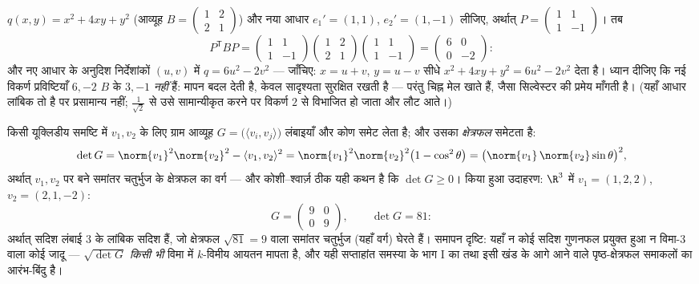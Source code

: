 \begin{example}[सर्वांगसमता क्रिया में]\label{ex:b2:quadratic:congruence}
$q(x, y) = x^2 + 4xy + y^2$ (आव्यूह $B = \begin{pmatrix} 1
& 2\\ 2 & 1\end{pmatrix}$) और नया आधार $e_1' = (1, 1)$, $e_2' = (1, -1)$ लीजिए, अर्थात् $P = \begin{pmatrix} 1 & 1\\ 1 &
-1\end{pmatrix}$। तब
\[
P^{\mathsf T}BP
= \begin{pmatrix} 1 & 1\\ 1 & -1\end{pmatrix}
\begin{pmatrix} 1 & 2\\ 2 & 1\end{pmatrix}
\begin{pmatrix} 1 & 1\\ 1 & -1\end{pmatrix}
= \begin{pmatrix} 6 & 0\\ 0 & -2\end{pmatrix} :
\]
और नए आधार के अनुदिश निर्देशांकों $(u, v)$ में $q = 6u^2 -
2v^2$ --- जाँचिए: $x = u + v$, $y = u - v$ सीधे
$x^2 + 4xy +
y^2 = 6u^2 - 2v^2$ देता है। ध्यान दीजिए कि नई विकर्ण प्रविष्टियाँ $6,
-2$ $B$ के
 $3, -1$ \emph{नहीं} हैं:  मापन बदल देती है, केवल
सादृश्यता  सुरक्षित रखती है --- परंतु चिह्न मेल खाते हैं, जैसा
सिल्वेस्टर की प्रमेय माँगती है। (यहाँ आधार लांबिक तो है पर प्रसामान्य
नहीं; $\frac{1}{\sqrt2}$ से उसे सामान्यीकृत करने पर विकर्ण $2$ से विभाजित हो जाता और
 लौट आते।)
\end{example}

\begin{example}[ग्राम सारणिक क्षेत्रफल मापते हैं]\label{ex:b2:quadratic:gramarea}
किसी यूक्लिडीय समष्टि में $v_1, v_2$ के लिए ग्राम आव्यूह $G =
\bigl(\langle v_i, v_j\rangle\bigr)$ लंबाइयाँ और कोण
समेट लेता है; और उसका  \emph{क्षेत्रफल} समेटता है:
\[
\det G = \norm{v_1}^2\norm{v_2}^2 - \langle v_1, v_2\rangle^2
= \norm{v_1}^2\norm{v_2}^2\bigl(1 - \cos^2\theta\bigr)
= \bigl(\norm{v_1}\,\norm{v_2}\sin\theta\bigr)^2 ,
\]
अर्थात् $v_1, v_2$ पर बने समांतर चतुर्भुज के क्षेत्रफल का वर्ग --- और
कोशी--श्वार्ज़ ठीक यही कथन है कि $\det G \geq 0$। किया हुआ उदाहरण: $\R^3$ में $v_1 = (1, 2, 2)$, $v_2 = (2, 1, -2)$:
\[
G = \begin{pmatrix} 9 & 0\\ 0 & 9 \end{pmatrix},
\qquad
\det G = 81 :
\]
अर्थात् सदिश लंबाई $3$ के लांबिक सदिश हैं, जो क्षेत्रफल $\sqrt{81} = 9$ वाला
समांतर चतुर्भुज (यहाँ वर्ग) घेरते हैं। समापन दृष्टि: यहाँ न कोई सदिश
गुणनफल प्रयुक्त हुआ न विमा-$3$ वाला कोई जादू --- $\sqrt{\det G}$ \emph{किसी भी}
विमा में $k$-विमीय आयतन मापता है, और यही सप्ताहांत समस्या के भाग I का
तथा इसी खंड के आगे आने वाले पृष्ठ-क्षेत्रफल समाकलों का आरंभ-बिंदु है।
\end{example}

